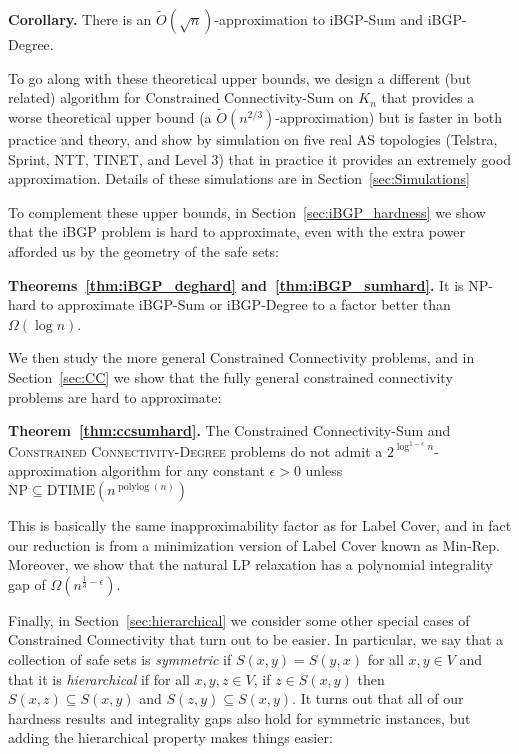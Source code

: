 \documentclass[11pt,letterpaper]{article}
\theoremstyle{definition}
\def\polylog{\operatorname{polylog}}
\begin{document}
{\bf Corollary.}\hspace{.01in}
  There is an $\tilde{O}(\sqrt{n})$-approximation to {\sc iBGP-Sum} and
  {\sc iBGP-Degree}.
\vspace{.1in}

To go along with these theoretical upper bounds, we design a different (but related) algorithm for {\sc Constrained Connectivity-Sum} on $K_n$ that provides a worse theoretical upper bound (a $\tilde{O}(n^{2/3})$-approximation) but is faster in both practice and theory, and show by simulation on five real AS topologies (Telstra, Sprint, NTT, TINET, and Level 3) that in practice it provides an extremely good approximation.  Details of these simulations are in Section~\ref{sec:Simulations}

To complement these upper bounds, in Section~\ref{sec:iBGP_hardness} we show that the iBGP problem is hard to approximate, even with the extra power afforded us by the geometry of the safe sets:
\vspace{.1in}

{\bf Theorems~\ref{thm:iBGP_deghard} and~\ref{thm:iBGP_sumhard}.}\hspace{.01in}
  It is NP-hard to approximate {\sc iBGP-Sum} or {\sc iBGP-Degree} to
  a factor better than $\Omega(\log n)$.
\vspace{.1in}

We then study the more general Constrained Connectivity problems, and in Section~\ref{sec:CC} we show that the fully general
constrained connectivity problems are hard to approximate:

\vspace{.1in}
{\bf Theorem~\ref{thm:ccsumhard}.}\hspace{.01in}
  {\sc The Constrained Connectivity-Sum} and \textsc{Constrained
    Connectivity-Degree} problems do not admit a $2^{\log^{1-\epsilon}
    n}$-approximation algorithm for any constant $\epsilon > 0$ unless
  $\text{NP} \subseteq \text{DTIME}(n^{\polylog(n)})$
\vspace{.1in}

This is basically the same inapproximability factor as for Label
Cover, and in fact our reduction is from a minimization version of
Label Cover known as {\sc Min-Rep}.  Moreover, we show that the
natural LP relaxation has a polynomial integrality gap of
$\Omega(n^{\frac13 - \epsilon})$.

Finally, in Section~\ref{sec:hierarchical}
 we consider some other special cases of Constrained
Connectivity that turn out to be easier.
In particular, we say that a collection of
safe sets is \emph{symmetric} if $S(x,y) = S(y,x)$ for all $x,y \in V$ and that it is \emph{hierarchical} if for all $x,y,z \in V$, if $z \in
S(x,y)$ then $S(x,z) \subseteq S(x,y)$ and $S(z,y) \subseteq S(x,y)$.  It turns out that all of our hardness results and integrality gaps also hold for symmetric instances, but adding the hierarchical property makes things easier:
\vspace{.1in}
\end{document}
